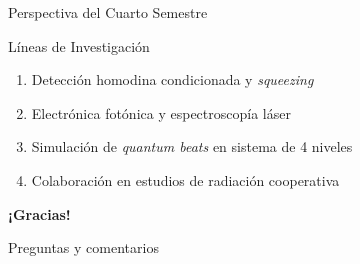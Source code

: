 \documentclass[10pt,xcolor=dvipsnames]{beamer}
\begin{document}
\begin{frame}{Perspectiva del Cuarto Semestre}
    \begin{block}{Líneas de Investigación}
        \begin{enumerate}
            \item Detección homodina condicionada y \textit{squeezing}
            \item Electrónica fotónica y espectroscopía láser
            \item Simulación de \textit{quantum beats} en sistema de 4 niveles
            \item Colaboración en estudios de radiación cooperativa
        \end{enumerate}
    \end{block}
\end{frame}

\begin{frame}
    \centering
    \Huge \textbf{¡Gracias!}
    
    \vspace{1cm}
    \large Preguntas y comentarios
\end{frame}
\end{document}

